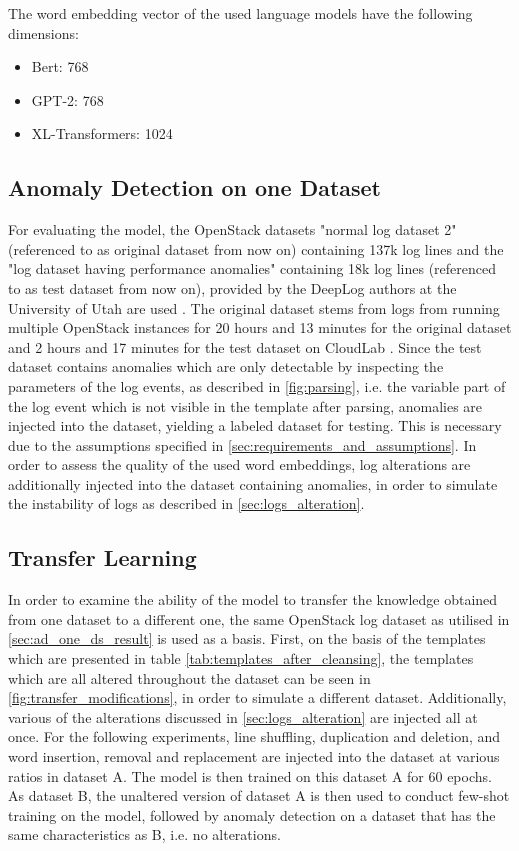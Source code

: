 \noindent The word embedding vector of the used language models have the following dimensions:
\begin{itemize}
	\item Bert: 768 
	\item GPT-2: 768
	\item XL-Transformers: 1024
\end{itemize}

\subsection{Anomaly Detection on one Dataset \label{sec:ad_one_ds_result}}
For evaluating the model, the OpenStack datasets "normal log dataset 2" (referenced to as original dataset from now on) containing 137k log lines and the "log dataset having performance anomalies" containing 18k log lines (referenced to as test dataset from now on), provided by the DeepLog authors at the University of Utah are used \cite{utah_dataset}. The original dataset stems from logs from running multiple OpenStack instances for 20 hours and 13 minutes for the original dataset and 2 hours and 17 minutes for the test dataset on CloudLab \cite{cloudlab}. Since the test dataset contains anomalies which are only detectable by inspecting the parameters of the log events, as described in \ref{fig:parsing}, i.e. the variable part of the log event which is not visible in the template after parsing, anomalies are injected into the dataset, yielding a labeled dataset for testing. This is necessary due to the assumptions specified in \ref{sec:requirements_and_assumptions}.
In order to assess the quality of the used word embeddings, log alterations are additionally injected into the dataset containing anomalies, in order to simulate the instability of logs as described in \ref{sec:logs_alteration}.


\subsection{Transfer Learning \label{sec:transfer_learning_setup}}
In order to examine the ability of the model to transfer the knowledge obtained from one dataset to a different one, the same OpenStack log dataset as utilised in \ref{sec:ad_one_ds_result} is used as a basis. First, on the basis of the templates which are presented in table \ref{tab:templates_after_cleansing}, the templates which are all altered throughout the dataset can be seen in \ref{fig:transfer_modifications}, in order to simulate a different dataset. Additionally, various of the alterations discussed in \ref{sec:logs_alteration} are injected all at once. For the following experiments, line shuffling, duplication and deletion, and word insertion, removal and replacement are injected into the dataset at various ratios in dataset A. The model is then trained on this dataset A for 60 epochs. As dataset B, the unaltered version of dataset A is then used to conduct few-shot training on the model, followed by anomaly detection on a dataset that has the same characteristics as B, i.e. no alterations.

